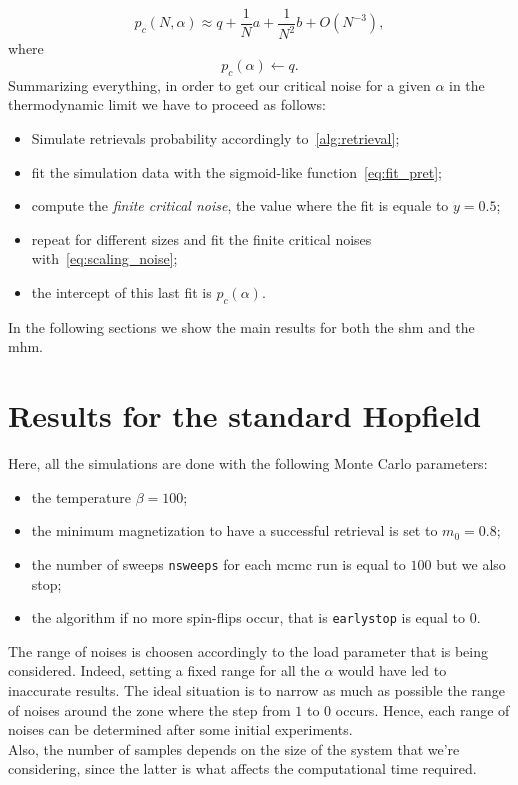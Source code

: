 \documentclass[\rootdir/main.tex]{subfiles}
\begin{document}
\begin{equation}\label{eq:scaling_noise}
    p_c(N, \alpha) \approx q + \frac{1}{N}a + \frac{1}{N^2} b + O\left(N^{-3}\right),
\end{equation}
where
\begin{equation*}
    p_c(\alpha) \gets q.
\end{equation*}
Summarizing everything, in order to get our critical noise for a given $\alpha$ in the thermodynamic limit we have to proceed as follows:
\begin{itemize}
    \item Simulate retrievals probability accordingly to~\cref{alg:retrieval};
    \item fit the simulation data with the sigmoid-like function~\cref{eq:fit_pret};
    \item compute the \emph{finite critical noise}, \ie the value where the fit is equale to $y = 0.5$;
    \item repeat for different sizes and fit the finite critical noises with~\cref{eq:scaling_noise};
    \item the intercept of this last fit is $p_c(\alpha)$.
\end{itemize}

In the following sections we show the main results for both the \acrshort{shm} and the \acrshort{mhm}.

\section{Results for the standard Hopfield}
Here, all the simulations are done with the following Monte Carlo parameters:
\begin{itemize}
    \item the temperature $\beta = 100$;
    \item the minimum magnetization to have a successful retrieval is set to $m_0 = 0.8$;
    \item the number of sweeps \texttt{nsweeps} for each \acrshort{mcmc} run is equal to $100$ but we also stop; \item the algorithm if no more spin-flips occur, that is \texttt{earlystop} is equal to $0$.
\end{itemize}
The range of noises is choosen accordingly to the load parameter that is being considered. Indeed, setting a fixed range for all the $\alpha$ would have led to inaccurate results. The ideal situation is to narrow as much as possible the range of noises ​​around the zone where the step from $1$ to $0$ occurs. Hence, each range of noises can be determined after some initial experiments.\\
Also, the number of samples depends on the size of the system that we're considering, since the latter is what affects the computational time required. 
\end{document}

